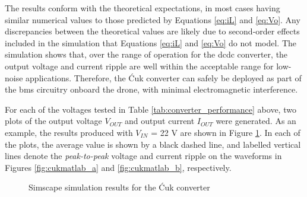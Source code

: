  The results conform with the theoretical expectations, in most cases having similar numerical values to those predicted by Equations \ref{eq:iL} and \ref{eq:Vo}. Any discrepancies between the theoretical values are likely due to second-order effects included in the simulation that Equations \ref{eq:iL} and \ref{eq:Vo} do not model. The simulation shows that, over the range of operation for the \acrshort{dcdc} converter, the output voltage and current ripple are well within the acceptable range for low-noise applications. Therefore, the Ćuk converter can safely be deployed as part of the \acrshort{bms} circuitry onboard the drone, with minimal electromagnetic interference.


For each of the voltages tested in Table \ref{tab:converter_performance} above, two plots of the output voltage $V_{OUT}$ and output current $I_{OUT}$ were generated. As an example, the results produced with $V_{IN}$ = 22 V are shown in Figure \ref{fig:cukmatlab}. In each of the plots, the average value is shown by a black dashed line, and labelled vertical lines denote the \textit{peak-to-peak} voltage and current ripple on the waveforms in Figures \ref{fig:cukmatlab_a} and \ref{fig:cukmatlab_b}, respectively. 

\begin{figure}[H]
\centering
{}

\vspace{0.1cm} %

\caption{Simscape simulation results for the Ćuk converter}
\label{fig:cukmatlab}
\end{figure}


